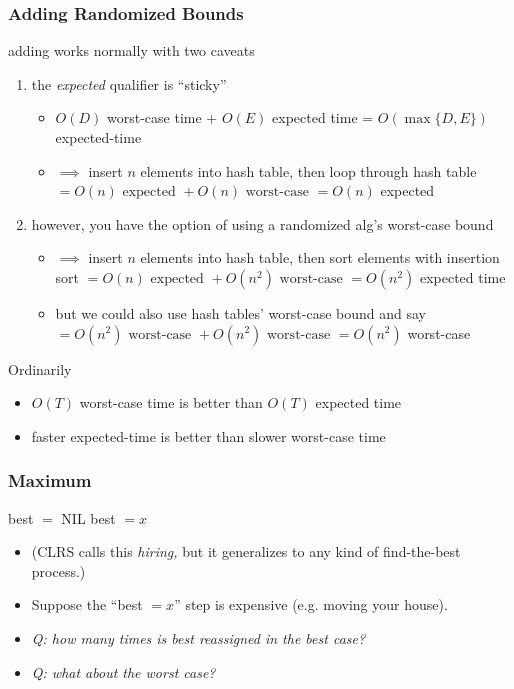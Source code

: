 \documentclass[10pt]{beamer}
\begin{document}
\begin{frame} \frametitle{Adding Randomized Bounds}
adding works normally with two caveats
\begin{enumerate}
  \item the \emph{expected} qualifier is ``sticky''
    \begin{itemize}
      \item $O(D)$ worst-case time + $O(E)$ expected time = $O(\max\{D,E\})$ expected-time
      \item $\implies$ insert $n$ elements into hash table, then loop through hash table
        $= O(n) \text{ expected } + O(n) \text{ worst-case } = O(n)$ expected
    \end{itemize}
  \item however, you have the option of using a randomized alg's worst-case bound
    \begin{itemize}
      \item $\implies$ insert $n$ elements into hash table, then sort elements with
        insertion sort
        $ = O(n) \text{ expected } + O(n^2) \text{ worst-case } = O(n^2)$ expected time
      \item but we could also use hash tables' worst-case bound and say
        $= O(n^2) \text{ worst-case } + O(n^2) \text{ worst-case } = O(n^2)$ worst-case
    \end{itemize}
\end{enumerate}

Ordinarily
\begin{itemize}
  \item $O(T)$ worst-case time is better than $O(T)$ expected time
  \item faster expected-time is better than slower worst-case time
\end{itemize}
\end{frame}

\begin{frame} \frametitle{Maximum}
  {\footnotesize
  \begin{algorithmic}[1]
    \State best $ = $ NIL
        \State best $= x$
      \EndIf
    \EndFor
    \State {}
    \EndFunction
  \end{algorithmic}
  }
  \begin{itemize}
  \item (CLRS calls this \emph{hiring,} but it generalizes to any kind of find-the-best process.)
  \item Suppose the ``best $= x$'' step is expensive (e.g. moving your house).
  \item \emph{Q: how many times is best reassigned in the best case?}
  \item \emph{Q: what about the worst case?}
\end{itemize}
\end{frame}
\end{document}
